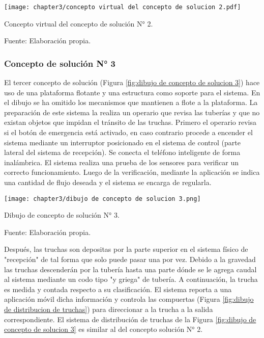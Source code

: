 \begin{myfigure}[H]
	\footnotesize\centering
	\texttt{[image: chapter3/concepto virtual del concepto de solucion 2.pdf]}
	\caption{Concepto virtual del concepto de solución N° 2.}
	\begin{myflushcenter}
		Fuente: Elaboración propia.
	\end{myflushcenter}
	\label{fig:concepto virtual del concepto de solucion 2}
\end{myfigure}

\subsubsection{Concepto de solución N° 3}

El tercer concepto de solución (Figura \ref{fig:dibujo de concepto de solucion 3}) hace uso de una plataforma flotante y una estructura como soporte para el sistema. En el dibujo se ha omitido los mecanismos que mantienen a flote a la plataforma. La preparación de este sistema la realiza un operario que revisa las tuberías y que no existan objetos que impidan el tránsito de las truchas. Primero el operario revisa si el botón de emergencia está activado, en caso contrario procede a encender el sistema mediante un interruptor posicionado en el sistema de control (parte lateral del sistema de recepción). Se conecta el teléfono inteligente de forma inalámbrica. El sistema realiza una prueba de los sensores para verificar un correcto funcionamiento. Luego de la verificación, mediante la aplicación se indica una cantidad de flujo deseada y el sistema se encarga de regularla.

\begin{myfigure}[H]
	\footnotesize\centering
	\texttt{[image: chapter3/dibujo de concepto de solucion 3.png]}
	\caption{Dibujo de concepto de solución N° 3.}
	\begin{myflushcenter}
		Fuente: Elaboración propia.
	\end{myflushcenter}
	\label{fig:dibujo de concepto de solucion 3}
\end{myfigure}

Después, las truchas son depositas por la parte superior en el sistema físico de "recepción" de tal forma que solo puede pasar una por vez. Debido a la gravedad las truchas descenderán por la tubería hasta una parte dónde se le agrega caudal al sistema mediante un codo tipo "y griega" de tubería. A continuación, la trucha es medida y contada respecto a su clasificación. El sistema reporta a una aplicación móvil dicha información y controla las compuertas (Figura \ref{fig:dibujo de distribucion de truchas}) para direccionar a la trucha a la salida correspondiente. El sistema de distribución de truchas  de la Figura \ref{fig:dibujo de concepto de solucion 3} es similar al del concepto solución N° 2.


